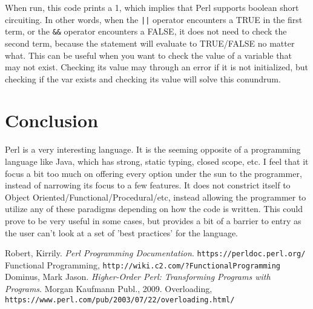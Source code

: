 \documentclass[12pt]{article}
\newcommand{\li}[1]{\lstinline{#1}} %
\begin{document}
	
	
	When run, this code prints a 1, which implies that Perl supports boolean short circuiting. In other words, when the \li{||} operator encounters a TRUE in the first term, or the \li{&&} operator encounters a FALSE, it does not need to check the second term, because the statement will evaluate to TRUE/FALSE no matter what. This can be useful when you want to check the value of a variable that may not exist. Checking its value may through an error if it is not initialized, but checking if the var exists and checking its value will solve this conundrum.
	
	\section{Conclusion}
	
	Perl is a very interesting language. It is the seeming opposite of a programming language like Java, which has strong, static typing, closed scope, etc. I feel that it focus a bit too much on offering every option under the sun to the programmer, instead of narrowing its focus to a few features. It does not constrict itself to Object Oriented/Functional/Procedural/etc, instead allowing the programmer to utilize any of these paradigms depending on how the code is written. This could prove to be very useful in some cases, but provides a bit of a barrier to entry as the user can't look at a set of 'best practices' for the language.
	
	\begin{thebibliography}{4}
		 Robert, Kirrily. \textit{Perl Programming Documentation}. \texttt{https://perldoc.perl.org/}
		 Functional Programming, \texttt{http://wiki.c2.com/?FunctionalProgramming}
		Dominus, Mark Jason. \textit{Higher-Order Perl: Transforming Programs with Programs}. Morgan Kaufmann Publ., 2009.
		 Overloading, \texttt{https://www.perl.com/pub/2003/07/22/overloading.html/}
	\end{thebibliography}
\end{document}
